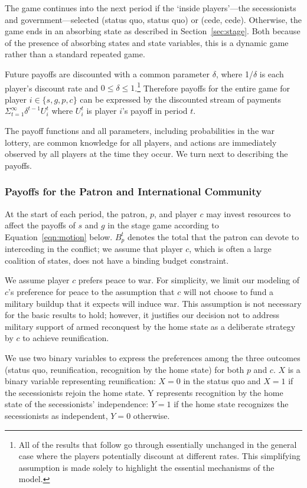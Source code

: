 \documentclass[11pt,letterpaper, notitlepage]{article}
\newcommand{\de}{\delta}
\begin{document}
The game continues into the next period if the `inside players'---the secessionists and government---selected (status quo, status quo) or (cede, cede). Otherwise, the game ends in an absorbing state as described in Section~\ref{sec:stage}. Both because of the presence of absorbing states and state variables, this is a dynamic game rather than a standard repeated game.

Future payoffs are discounted with a common parameter $\de$, where 1/$\de$ is each player's discount rate and $0\leq\de\leq1$.\footnote{All of the results that follow go through essentially unchanged in the general case where the players potentially discount at different rates. This simplifying assumption is made solely to highlight the essential mechanisms of the model.} Therefore payoffs for the entire game for player $i\in \{s, g, p, c\} $ can be expressed by the discounted stream of payments $\Sigma_{t=1}^{\infty} \de^{t-1} U_i^t $ where $U_i^t$ is player $i$'s payoff in period $t$.

The payoff functions and all parameters, including probabilities in the war lottery, are common knowledge for all players, and actions are immediately observed by all players at the time they occur. We turn next to describing the payoffs.


\subsubsection{Payoffs for the Patron and International Community}

At the start of each period, the patron, $p$, and player $c$ may invest resources to affect the payoffs of $s$ and $g$ in the stage game according to Equation~\ref{eqn:motion} below. $B_p^t$ denotes the total that the patron can devote to interceding in the conflict; we assume that player $c$, which is often a large coalition of states, does not have a binding budget constraint.

We assume player $c$ prefers peace to war. For simplicity, we limit our modeling of $c$'s preference for peace to the assumption that $c$ will not choose to fund a military buildup that it expects will induce war. This assumption is not necessary for the basic results to hold; however, it justifies our decision not to address military support of armed reconquest by the home state as a deliberate strategy by $c$ to achieve reunification. 

We use two binary variables to express the preferences among the three outcomes (status quo, reunification, recognition by the home state) for both $p$ and $c$. $X$ is a binary variable representing reunification: $X=0$ in the status quo and $X=1$ if the secessionists rejoin the home state. Y represents recognition by the home state of the secessionists' independence: $Y=1$ if the home state recognizes the secessionists as independent, $Y=0$ otherwise. 
\end{document}
